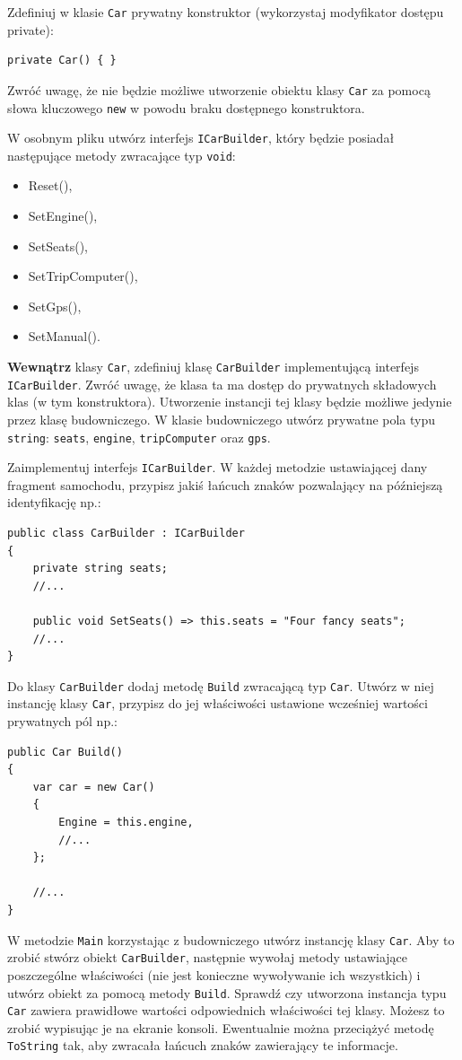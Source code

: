 Zdefiniuj w klasie \texttt{Car} prywatny konstruktor (wykorzystaj modyfikator dostępu private):
\begin{lstlisting}
private Car() { }
\end{lstlisting}
Zwróć uwagę, że nie będzie możliwe utworzenie obiektu klasy \texttt{Car} za pomocą słowa kluczowego \texttt{new} w powodu braku dostępnego konstruktora.

W osobnym pliku utwórz interfejs \texttt{ICarBuilder}, który będzie posiadał następujące metody zwracające typ \texttt{void}:
\begin{itemize}
	\item Reset(),
	\item SetEngine(),
	\item SetSeats(),
	\item SetTripComputer(),
	\item SetGps(),
	\item SetManual().
\end{itemize}

\textbf{Wewnątrz} klasy \texttt{Car}, zdefiniuj klasę \texttt{CarBuilder} implementującą interfejs \texttt{ICarBuilder}. Zwróć uwagę, że klasa ta ma dostęp do prywatnych składowych klas (w tym konstruktora). Utworzenie instancji tej klasy będzie możliwe jedynie przez klasę budowniczego. W klasie budowniczego utwórz prywatne pola typu \texttt{string}: \texttt{seats}, \texttt{engine}, \texttt{tripComputer} oraz \texttt{gps}.

Zaimplementuj interfejs \texttt{ICarBuilder}. W każdej metodzie ustawiającej dany fragment samochodu, przypisz jakiś łańcuch znaków pozwalający na późniejszą identyfikację np.:
\begin{lstlisting}
public class CarBuilder : ICarBuilder
{
	private string seats;
	//...
	
	public void SetSeats() => this.seats = "Four fancy seats";
	//...		
}
\end{lstlisting}

Do klasy \texttt{CarBuilder} dodaj metodę \texttt{Build} zwracającą typ \texttt{Car}. Utwórz w niej instancję klasy \texttt{Car}, przypisz do jej właściwości ustawione wcześniej wartości prywatnych pól np.:
\begin{lstlisting}
public Car Build()
{
	var car = new Car()
	{
		Engine = this.engine,
		//...
	};
	
	//...
}
\end{lstlisting}

W metodzie \texttt{Main} korzystając z budowniczego utwórz instancję klasy \texttt{Car}. Aby to zrobić stwórz obiekt \texttt{CarBuilder}, następnie wywołaj metody ustawiające poszczególne właściwości (nie jest konieczne wywoływanie ich wszystkich) i utwórz obiekt za pomocą metody \texttt{Build}. Sprawdź czy utworzona instancja typu \texttt{Car} zawiera prawidłowe wartości odpowiednich właściwości tej klasy. Możesz to zrobić wypisując je na ekranie konsoli. Ewentualnie można przeciążyć metodę \texttt{ToString} tak, aby zwracała łańcuch znaków zawierający te informacje.

